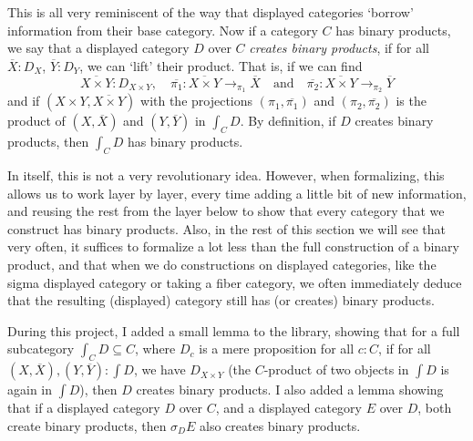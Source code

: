 This is all very reminiscent of the way that displayed categories `borrow' information from their base category. Now if a category $ C $ has binary products, we say that a displayed category $ D $ over $ C $ \textit{creates binary products}, if for all $ \overline X : D_X $, $ \overline Y : D_Y $, we can `lift' their product. That is, if we can find
\[ \overline{X \times Y} : D_{X \times Y}, \quad \overline{\pi_1} : \overline{X \times Y} \to_{\pi_1} \overline X \quad \text{and} \quad \overline{\pi_2} : \overline{X \times Y} \to_{\pi_2} \overline Y \]
and if $ (X \times Y, \overline{X \times Y}) $ with the projections $ (\pi_1, \overline{\pi_1}) $ and $ (\pi_2, \overline{\pi_2}) $ is the product of $ (X, \overline X) $ and $ (Y, \overline Y) $ in $ \int_C D $. By definition, if $ D $ creates binary products, then $ \int_C D $ has binary products.

In itself, this is not a very revolutionary idea. However, when formalizing, this allows us to work layer by layer, every time adding a little bit of new information, and reusing the rest from the layer below to show that every category that we construct has binary products. Also, in the rest of this section we will see that very often, it suffices to formalize a lot less than the full construction of a binary product, and that when we do constructions on displayed categories, like the sigma displayed category or taking a fiber category, we often immediately deduce that the resulting (displayed) category still has (or creates) binary products.

During this project, I added a small lemma to the library, showing that for a full subcategory $ \int_C D \subseteq C $, where $ D_c $ is a mere proposition for all $ c : C $, if for all $ (X, \overline X), (Y, \overline Y) : \int D $, we have $ D_{X \times Y} $ (the $ C $-product of two objects in $ \int D $ is again in $ \int D $), then $ D $ creates binary products. I also added a lemma showing that if a displayed category $ D $ over $ C $, and a displayed category $ E $ over $ D $, both create binary products, then $ \sigma_D E $ also creates binary products.

